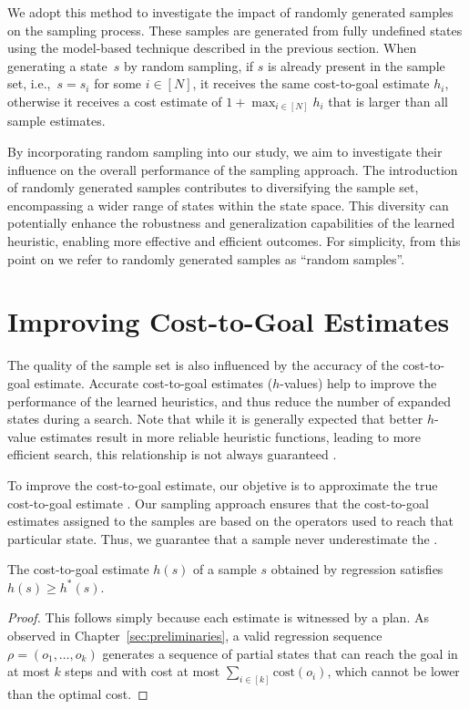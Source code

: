 We adopt this method to investigate the impact of randomly generated samples on the sampling process. These samples are generated from fully undefined states using the model-based technique described in the previous section. When generating a state~$s$ by random sampling, if $s$ is already present in the sample set, i.e.,~$s = s_i$ for some $i\in[N]$, it receives the same cost-to-goal estimate $h_i$, otherwise it receives a cost estimate of $1+\max_{i\in[N]} h_i$ that is larger than all sample estimates.

By incorporating random sampling into our study, we aim to investigate their influence on the overall performance of the sampling approach. The introduction of randomly generated samples contributes to diversifying the sample set, encompassing a wider range of states within the state space. This diversity can potentially enhance the robustness and generalization capabilities of the learned heuristic, enabling more effective and efficient outcomes. For simplicity, from this point on we refer to randomly generated samples as ``random samples''.

\section{Improving Cost-to-Goal Estimates}
\label{sec:hvalue}

The quality of the sample set is also influenced by the accuracy of the cost-to-goal estimate. Accurate cost-to-goal estimates ($h$-values) help to improve the performance of the learned heuristics, and thus reduce the number of expanded states during a search. Note that while it is generally expected that better $h$-value estimates result in more reliable heuristic functions, leading to more efficient search, this relationship is not always guaranteed \cite{Holte/2010}.

To improve the cost-to-goal estimate, our objetive is to approximate the true cost-to-goal estimate \hstar. Our sampling approach ensures that the cost-to-goal estimates assigned to the samples are based on the operators used to reach that particular state. Thus, we guarantee that a sample never underestimate the \hstar.

\begin{property}
    \label{prop:hvalue}
    The cost-to-goal estimate $h(s)$ of a sample $s$ obtained by regression satisfies $h(s)\geq h^*(s)$.
\end{property}
\begin{proof}
    This follows simply because each estimate is witnessed by a plan. As observed in Chapter~\ref{sec:preliminaries}, a valid regression sequence $\rho=(o_1,\ldots,o_k)$ generates a sequence of partial states that can reach the goal in at most $k$ steps and with cost at most $\sum_{i\in[k]}\text{cost}(o_i)$, which cannot be lower than the optimal cost.
\end{proof}

